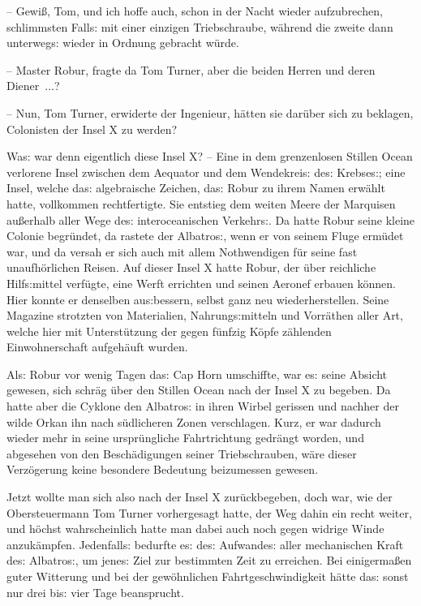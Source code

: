 \documentclass[oneside,12pt]{book}
\newcommand{\s}{s:}
\begin{document}
-- Gewi{\ss}, Tom, und ich hoffe auch, schon in der Nacht wieder
aufzubrechen, schlimmsten Fall{\s} mit einer einzigen Triebschraube,
w\"ahrend die zweite dann unterweg{\s} wieder in Ordnung gebracht
w\"urde.

-- Master Robur, fragte da Tom Turner, aber die beiden Herren und
deren Diener~...?

-- Nun, Tom Turner, erwiderte der Ingenieur, h\"atten sie dar\"uber
sich zu beklagen, Colonisten der Insel X zu werden?{\grqq}

Wa{\s} war denn eigentlich diese Insel X? -- Eine in dem grenzenlosen
Stillen Ocean verlorene Insel zwischen dem Aequator und dem
Wendekrei{\s} de{\s} Krebse{\s}; eine Insel, welche da{\s}
algebraische Zeichen, da{\s} Robur zu ihrem Namen erw\"ahlt hatte,
vollkommen rechtfertigte. Sie entstieg dem weiten Meere der Marquisen
au{\ss}erhalb aller Wege de{\s} interoceanischen Verkehr{\s}. Da
hatte Robur seine kleine Colonie begr\"undet, da rastete der
{\glqq}Albatro{\s}{\grqq}, wenn er von seinem Fluge erm\"udet war,
und da versah er sich auch mit allem Nothwendigen f\"ur seine fast
unaufh\"orlichen Reisen. Auf dieser Insel X hatte Robur, der \"uber
reichliche Hilf{\s}mittel verf\"ugte, eine Werft errichten und seinen
Aeronef erbauen k\"onnen. Hier konnte er denselben au{\s}bessern,
selbst ganz neu wiederherstellen. Seine Magazine strotzten von
Materialien, Nahrung{\s}mitteln und Vorr\"athen aller Art, welche
hier mit Unterst\"utzung der gegen f\"unfzig K\"opfe z\"ahlenden
Einwohnerschaft aufgeh\"auft wurden.

Al{\s} Robur vor wenig Tagen da{\s} Cap Horn umschiffte, war e{\s}
seine Absicht gewesen, sich schr\"ag \"uber den Stillen Ocean nach
der Insel X zu begeben. Da hatte aber die Cyklone den
{\glqq}Albatro{\s}{\grqq} in ihren Wirbel gerissen und nachher der
wilde Orkan ihn nach s\"udlicheren Zonen verschlagen. Kurz, er war
dadurch wieder mehr in seine urspr\"ungliche Fahrtrichtung gedr\"angt
worden, und abgesehen von den Besch\"adigungen seiner Triebschrauben,
w\"are dieser Verz\"ogerung keine besondere Bedeutung beizumessen
gewesen.

Jetzt wollte man sich also nach der Insel X zur\"uckbegeben, doch
war, wie der Obersteuermann Tom Turner vorhergesagt hatte, der Weg
dahin ein recht weiter, und h\"ochst wahrscheinlich hatte man dabei
auch noch gegen widrige Winde anzuk\"ampfen. Jedenfall{\s} bedurfte
e{\s} de{\s} Aufwande{\s} aller mechanischen Kraft de{\s}
{\glqq}Albatro{\s}{\grqq}, um jene{\s} Ziel zur bestimmten Zeit zu
erreichen. Bei einigerma{\ss}en guter Witterung und bei der
gew\"ohnlichen Fahrtgeschwindigkeit h\"atte da{\s} sonst nur drei
bi{\s} vier Tage beansprucht.
\end{document}
